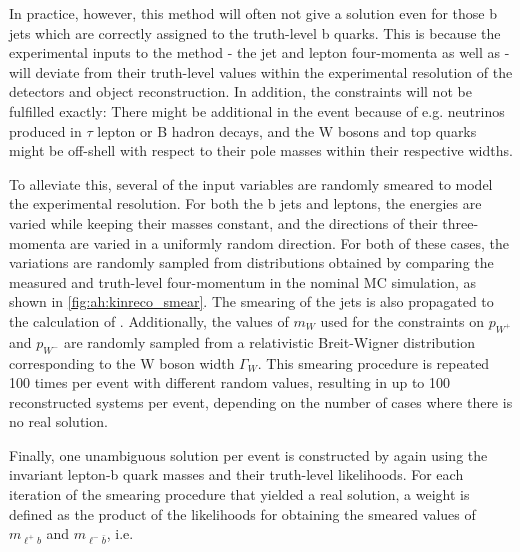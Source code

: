 In practice, however, this method will often not give a solution even for those b jets which are correctly assigned to the truth-level b quarks. This is because the experimental inputs to the method - the jet and lepton four-momenta as well as \ptmissvec - will deviate from their truth-level values within the experimental resolution of the detectors and object reconstruction. In addition, the constraints will not be fulfilled exactly: There might be additional \ptmiss in the event because of e.g. neutrinos produced in $\tau$ lepton or B hadron decays, and the W bosons and top quarks might be off-shell with respect to their pole masses within their respective widths.

To alleviate this, several of the input variables are randomly smeared to model the experimental resolution. For both the b jets and leptons, the energies are varied while keeping their masses constant, and the directions of their three-momenta are varied in a uniformly random direction. For both of these cases, the variations are randomly sampled from distributions obtained by comparing the measured and truth-level four-momentum in the nominal \ttbar MC simulation, as shown in \cref{fig:ah:kinreco_smear}. The smearing of the jets is also propagated to the calculation of \ptmissvec. Additionally, the values of $m_W$ used for the constraints on $p_{W^+}$ and $p_{W^-}$ are randomly sampled from a relativistic Breit-Wigner distribution corresponding to the W boson width $\Gamma_W$. This smearing procedure is repeated 100 times per event with different random values, resulting in up to 100 reconstructed \ttbar systems per event, depending on the number of cases where there is no real solution. %

Finally, one unambiguous solution per event is constructed by again using the invariant lepton-b quark masses and their truth-level likelihoods. 
For each iteration of the smearing procedure that yielded a real solution, a weight is defined as the product of the likelihoods for obtaining the smeared values of $m_{\ell^+ b}$ and $m_{\ell^- \bar{b}}$, i.e.


